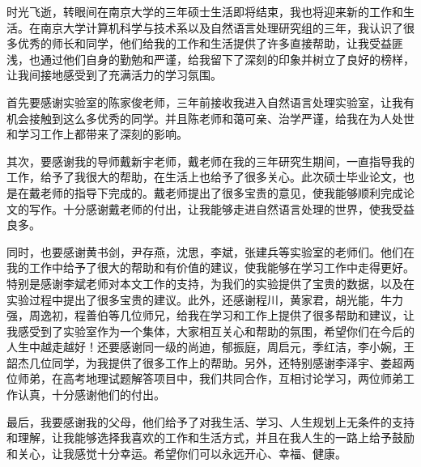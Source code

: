 \documentclass[master, winfont]{njuthesis}
\begin{document}
\begin{acknowledgement}
  时光飞逝，转眼间在南京大学的三年硕士生活即将结束，我也将迎来新的工作和生活。在南京大学计算机科学与技术系以及自然语言处理研究组的三年，我认识了很多优秀的师长和同学，他们给我的工作和生活提供了许多直接帮助，让我受益匪浅，也通过他们自身的勤勉和严谨，给我留下了深刻的印象并树立了良好的榜样，让我间接地感受到了充满活力的学习氛围。

  首先要感谢实验室的陈家俊老师，三年前接收我进入自然语言处理实验室，让我有机会接触到这么多优秀的同学。并且陈老师和蔼可亲、治学严谨，给我在为人处世和学习工作上都带来了深刻的影响。
  
  其次，要感谢我的导师戴新宇老师，戴老师在我的三年研究生期间，一直指导我的工作，给予了我很大的帮助，在生活上也给予了很多关心。此次硕士毕业论文，也是在戴老师的指导下完成的。戴老师提出了很多宝贵的意见，使我能够顺利完成论文的写作。十分感谢戴老师的付出，让我能够走进自然语言处理的世界，使我受益良多。

  同时，也要感谢黄书剑，尹存燕，沈思，李斌，张建兵等实验室的老师们。他们在我的工作中给予了很大的帮助和有价值的建议，使我能够在学习工作中走得更好。特别是感谢李斌老师对本文工作的支持，为我们的实验提供了宝贵的数据，以及在实验过程中提出了很多宝贵的建议。此外，还感谢程川，黄家君，胡光能，牛力强，周逸初，程善伯等几位师兄，给我在学习和工作上提供了很多帮助和建议，让我感受到了实验室作为一个集体，大家相互关心和帮助的氛围，希望你们在今后的人生中越走越好！还要感谢同一级的尚迪，郁振庭，周启元，季红洁，李小婉，王韶杰几位同学，为我提供了很多工作上的帮助。另外，还特别感谢李泽宇、娄超两位师弟，在高考地理试题解答项目中，我们共同合作，互相讨论学习，两位师弟工作认真，十分感谢他们的付出。
  
  最后，我要感谢我的父母，他们给予了对我生活、学习、人生规划上无条件的支持和理解，让我能够选择我喜欢的工作和生活方式，并且在我人生的一路上给予鼓励和关心，让我感觉十分幸运。希望你们可以永远开心、幸福、健康。
   
\end{acknowledgement}
\appendix
\backmatter
\end{document}
